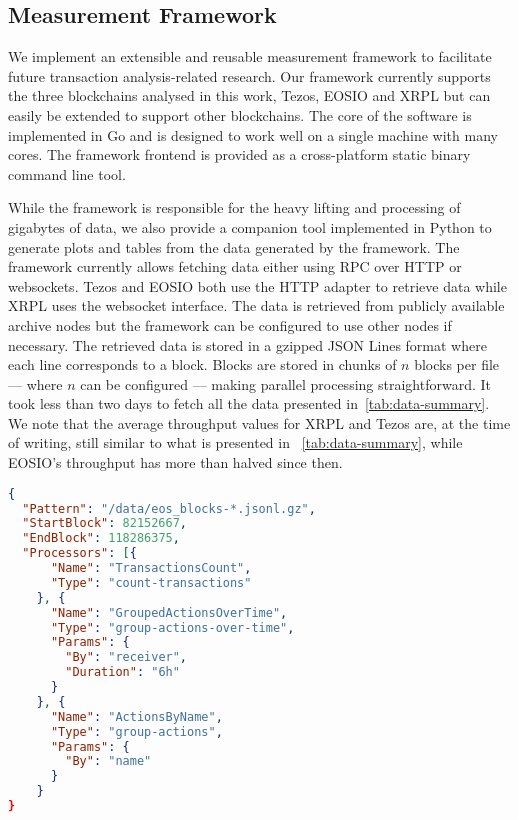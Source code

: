 \subsection{Measurement Framework}
We implement an extensible and reusable measurement framework to facilitate future transaction analysis-related research.
Our framework currently supports the three blockchains analysed in this work, Tezos, EOSIO and XRPL but can easily be extended to support other blockchains.
The core of the software is implemented in Go and is designed to work well on a single machine with many cores.
The framework frontend is provided as a cross-platform static binary command line tool.

While the framework is responsible for the heavy lifting and processing of gigabytes of data, we also provide a companion tool implemented in Python to generate plots and tables from the data generated by the framework.
The framework currently allows fetching data either using RPC over HTTP or websockets.
Tezos and EOSIO both use the HTTP adapter to retrieve data while XRPL uses the websocket interface.
The data is retrieved from publicly available archive nodes but the framework can be configured to use other nodes if necessary.
The retrieved data is stored in a gzipped JSON Lines format where each line corresponds to a block. Blocks are stored in chunks of $n$ blocks per file --- where $n$ can be configured --- making parallel processing straightforward. It took less than two days to fetch all the data presented in~\autoref{tab:data-summary}.
We note that the average throughput values for XRPL and Tezos are, at the time of writing, still similar to what is presented in ~\autoref{tab:data-summary}, while EOSIO's throughput has more than halved since then.

\begin{lstlisting}[language=json,caption=Configuration file for our measurement framework,label=lis:framework-config]
{
  "Pattern": "/data/eos_blocks-*.jsonl.gz",
  "StartBlock": 82152667,
  "EndBlock": 118286375,
  "Processors": [{
      "Name": "TransactionsCount",
      "Type": "count-transactions"
    }, {
      "Name": "GroupedActionsOverTime",
      "Type": "group-actions-over-time",
      "Params": {
        "By": "receiver",
        "Duration": "6h"
      }
    }, {
      "Name": "ActionsByName",
      "Type": "group-actions",
      "Params": {
        "By": "name"
      }
    }
}
\end{lstlisting}

